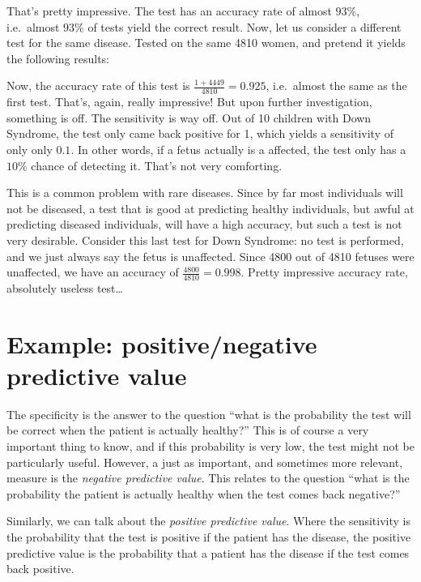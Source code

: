 \documentclass[]{book}
\theoremstyle{definition}
\theoremstyle{definition}
\theoremstyle{definition}
\theoremstyle{remark}
\begin{document}
That's pretty impressive. The test has an accuracy rate of almost \(93\%\), i.e.~almost \(93\%\) of tests yield the correct result. Now, let us consider a different test for the same disease. Tested on the same 4810 women, and pretend it yields the following results:

\hypertarget{htmlwidget-17ea6fb7bd90fbb45135}{}

Now, the accuracy rate of this test is \(\frac{1 + 4449}{4810} = 0.925\), i.e.~almost the same as the first test. That's, again, really impressive! But upon further investigation, something is off. The sensitivity is way off. Out of 10 children with Down Syndrome, the test only came back positive for 1, which yields a sensitivity of only only \(0.1\). In other words, if a fetus actually is a affected, the test only has a \(10\%\) chance of detecting it. That's not very comforting.

This is a common problem with rare diseases. Since by far most individuals will not be diseased, a test that is good at predicting healthy individuals, but awful at predicting diseased individuals, will have a high accuracy, but such a test is not very desirable. Consider this last test for Down Syndrome: no test is performed, and we just always say the fetus is unaffected. Since 4800 out of 4810 fetuses were unaffected, we have an accuracy of \(\frac{4800}{4810} = 0.998\). Pretty impressive accuracy rate, absolutely useless test\ldots{}

\hypertarget{example-positivenegative-predictive-value}{%
\section{Example: positive/negative predictive value}\label{example-positivenegative-predictive-value}}

The specificity is the answer to the question ``what is the probability the test will be correct when the patient is actually healthy?'' This is of course a very important thing to know, and if this probability is very low, the test might not be particularly useful. However, a just as important, and sometimes more relevant, measure is the \emph{negative predictive value}. This relates to the question ``what is the probability the patient is actually healthy when the test comes back negative?''

Similarly, we can talk about the \emph{positive predictive value}. Where the sensitivity is the probability that the test is positive if the patient has the disease, the positive predictive value is the probability that a patient has the disease if the test comes back positive.
\end{document}
